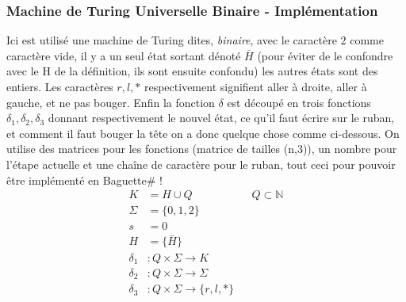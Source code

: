 \documentclass{beamer}
\newcommand{\bsf}{Baguette\# }
\begin{document}
    \begin{frame}[allowframebreaks]
        \frametitle{Machine de Turing Universelle Binaire - Implémentation}
        Ici est utilisé une machine de Turing dites, \textit{binaire}, avec le caractère $2$ comme caractère vide, 
        il y a un seul état sortant dénoté $\bar{H}$ (pour éviter de le confondre avec le H de la définition, ils sont ensuite confondu) 
        les autres états sont des entiers. 
        Les caractères $r,l,*$ respectivement signifient aller à droite, aller à gauche, et ne pas bouger.
        Enfin la fonction $\delta$ est découpé en trois fonctions $\delta_1,\delta_2,\delta_3$ donnant respectivement 
        le nouvel état, ce qu'il faut écrire sur le ruban, et comment il faut bouger la tête
         on a donc quelque chose comme ci-dessous. 
         On utilise des matrices pour les fonctions (matrice de tailles (n,3)), un nombre pour l'étape actuelle et une chaîne de caractère pour le ruban,
         tout ceci pour pouvoir être implémenté en \bsf!
        \begin{align*}
            K &= H \cup Q && Q \subset \mathbb{N} \\
            \Sigma &= \{0,1,2\} \\ 
            s &= 0 \\ 
            H &= \{\bar{H}\} \\ 
            \delta_1 &: Q \times \Sigma \to K \\ 
            \delta_2 &: Q \times \Sigma \to \Sigma \\ 
            \delta_3 &: Q \times \Sigma \to \{r,l,*\}
        \end{align*}
    \end{frame}
\end{document}
